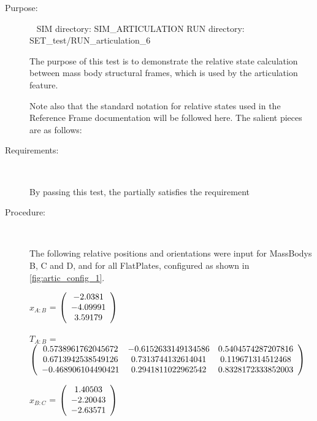\begin{description}

\item[Purpose:] \ \newline
SIM directory: SIM\_ARTICULATION
RUN directory: SET\_test/RUN\_articulation\_6

The purpose of this test is to demonstrate the relative state calculation
between mass body structural frames, which is used by the articulation
feature.

Note also that the standard notation for relative states used in the
Reference Frame documentation \cite{dynenv:REFFRAMES} will be
followed here. The salient
pieces are as follows:

\item[Requirements:] \ \newline

By passing this test, the \ModelDesc partially satisfies
the requirement 

\item[Procedure:] \ \newline

The following relative positions and orientations were input for MassBodys
B, C and D, and for all FlatPlates, configured as shown in
\ref{fig:artic_config_1}.

$x_{A:B}$ = $\left( \begin{array} {ccc}    -2.0381 \\   -4.09991 \\    3.59179 
\end{array} \right)\\ \\$

$T_{A:B}$ = $\left( \begin{array} {ccc} 
   0.5738961762045672 & -0.6152633149134586 & 0.5404574287207816 \\ 
   0.6713942538549126 & 0.7313744132614041 & 0.119671314512468 \\ 
   -0.468906104490421 & 0.2941811022962542 & 0.8328172333852003 \\
\end{array} \right)\\ \\$

$x_{B:C}$ = $\left( \begin{array} {ccc}    1.40503 \\   -2.20043 \\   -2.63571 
\end{array} \right)\\ \\$


\end{description}
